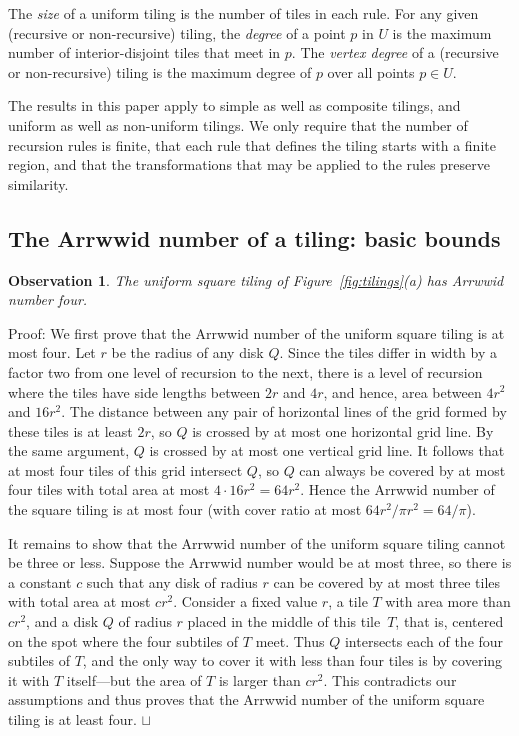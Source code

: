 \documentclass[11pt,a4paper]{article}
\newcommand{\unittile}{\ensuremath{U}\xspace}
\newenvironment{proof}{Proof:}{\qed}
\def\squareforqed{\hbox{\rlap{$\sqcap$}$\sqcup$}}
\def\qed{\ifmmode\squareforqed\else{\unskip\nobreak\hfil
\penalty50\hskip1em\null\nobreak\hfil\squareforqed
\parfillskip=0pt\finalhyphendemerits=0\endgraf}\fi}
\newtheorem{observation}{Observation}
\begin{document}
The \emph{size} of a uniform tiling is the number of tiles in each rule.
For any given (recursive or non-recursive) tiling, the \emph{degree} of a point $p$ in \unittile is the maximum number of interior-disjoint tiles that meet in $p$.
The \emph{vertex degree} of a (recursive or non-recursive) tiling is the maximum degree of $p$ over all points $p \in \unittile$.

The results in this paper apply to simple as well as composite tilings, and uniform as well as non-uniform tilings. We only require that the number of recursion rules is finite, that each rule that defines the tiling starts with a finite region, and that the transformations that may be applied to the rules preserve similarity.

\subsection{The Arrwwid number of a tiling: basic bounds}
\begin{observation}\label{ob:squaretiling}
The uniform square tiling of Figure~\ref{fig:tilings}(a) has Arrwwid number four.
\end{observation}
\begin{proof}
We first prove that the Arrwwid number of the uniform square tiling is at most four.
Let $r$ be the radius of any disk $Q$. Since the tiles differ in width by a factor two from one level of recursion to the next, there is a level of recursion where the tiles have side lengths between $2r$ and $4r$, and hence, area between $4r^2$ and $16r^2$. The distance between any pair of horizontal lines of the grid formed by these tiles is at least $2r$, so $Q$ is crossed by at most one horizontal grid line. By the same argument, $Q$ is crossed by at most one vertical grid line. It follows that at most four tiles of this grid intersect $Q$, so $Q$ can always be covered by at most four tiles with total area at most $4 \cdot 16r^2 = 64r^2$. Hence the Arrwwid number of the square tiling is at most four (with cover ratio at most $64r^2 / \pi r^2 = 64/\pi$).

It remains to show that the Arrwwid number of the uniform square tiling cannot be three or less. Suppose the Arrwwid number would be at most three, so there is a constant $c$ such that any disk of radius $r$ can be covered by at most three tiles with total area at most $cr^2$. Consider a fixed value $r$, a tile $T$ with area more than $c r^2$, and a disk $Q$ of radius $r$ placed in the middle of this tile~$T$, that is, centered on the spot where the four subtiles of $T$ meet. Thus $Q$ intersects each of the four subtiles of $T$, and the only way to cover it with less than four tiles is by covering it with $T$ itself---but the area of $T$ is larger than $c r^2$. This contradicts our assumptions and thus proves that the Arrwwid number of the uniform square tiling is at least four.
\end{proof}
\end{document}
